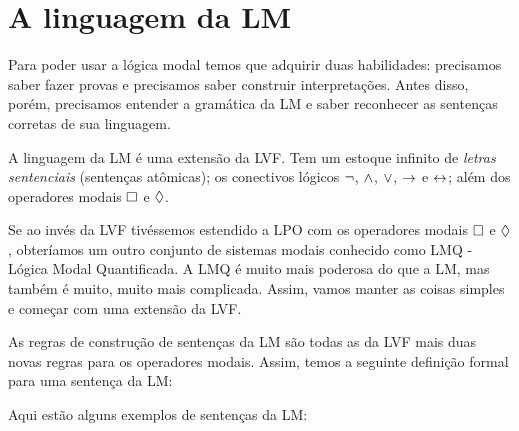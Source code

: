  

\section{A linguagem da LM}
\label{TFLtoML}

Para poder usar a lógica modal temos que adquirir duas habilidades: precisamos saber fazer provas e precisamos saber construir interpretações. Antes disso, porém, precisamos entender a gramática da LM e saber reconhecer as sentenças corretas de sua linguagem.

A linguagem da LM é uma extensão da LVF. Tem um estoque infinito de \emph{letras sentenciais} (sentenças atômicas); os conectivos lógicos $\neg$, $\wedge$,  $\vee$,    $\rightarrow$  e $\leftrightarrow$; além dos  operadores modais  $\Box$ e $\Diamond$.

Se ao invés da LVF tivéssemos estendido a LPO com os operadores modais  $\Box$ e $\Diamond$, obteríamos um outro conjunto de sistemas modais conhecido como LMQ - Lógica Modal Quantificada. A LMQ é muito mais poderosa do que a LM, mas também é muito, muito mais complicada. Assim,  vamos manter as coisas simples e começar com uma extensão da LVF. 

As regras de construção de  sentenças da LM são todas as da LVF mais duas novas regras para os operadores modais. Assim, temos a seguinte definição formal para uma sentença da LM:
 
Aqui estão alguns exemplos de sentenças  da LM:
 
